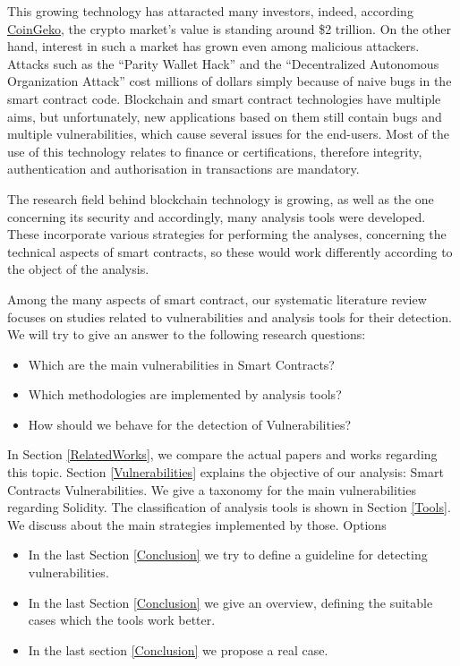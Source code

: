 \documentclass[a4paper,sigconf, language=french,
language=german, language=spanish, language=english]{acmart}
\begin{document}
This growing technology has attaracted many investors, indeed, according \href{https://www.coingecko.com/}{CoinGeko}, 
the crypto market's value is standing around \$2 trillion.
On the other hand, interest in such a market has grown even among malicious attackers. 
Attacks such as the “Parity Wallet Hack” and the “Decentralized Autonomous Organization Attack” cost millions of dollars simply because of 
naive bugs in the smart contract code. Blockchain and smart contract technologies have multiple aims, but unfortunately, new applications 
based on them still contain bugs and multiple vulnerabilities, which cause 
several issues for the end-users. Most of the use of this technology relates to finance or certifications, therefore integrity, 
authentication and authorisation in transactions are mandatory. 

The research field behind blockchain technology is growing, as well as the one concerning 
its security and accordingly, many analysis tools were developed. 
These incorporate various strategies for performing the analyses, concerning the technical aspects of smart contracts, 
so these would work differently according to the object of the analysis. 

Among the many aspects of smart contract, our systematic
literature review focuses on studies related to vulnerabilities and 
analysis tools for their detection. We will try to give an answer to the following 
research questions:
\begin{itemize}
    \item Which are the main vulnerabilities in Smart Contracts?
    \item Which methodologies are implemented by analysis tools?
    \item How should we behave for the detection of Vulnerabilities?
\end{itemize}

In Section \ref{RelatedWorks}, we compare the actual papers and works regarding this topic. 
Section \ref{Vulnerabilities} explains the objective of our analysis: Smart Contracts Vulnerabilities. 
We give a taxonomy for the main vulnerabilities regarding Solidity. The classification of analysis tools 
is shown in Section \ref{Tools}. We discuss about the main strategies implemented by those.
Options
\begin{itemize}
  \item In the last Section \ref{Conclusion} we try to define a guideline for detecting vulnerabilities. 
  \item In the last Section \ref{Conclusion} we give an overview, defining the suitable cases which 
the tools work better.
  \item In the last section \ref{Conclusion} we propose a real case.
\end{itemize}
\end{document}
